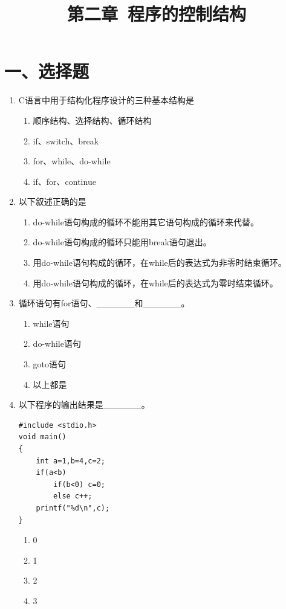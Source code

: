 \documentclass[a4paper,12pt]{article}
\title{\textbf{第二章\ 程序的控制结构}}
\author{}
\date{}
\begin{document}
\maketitle

\section*{一、选择题}

\begin{enumerate}
	\item C语言中用于结构化程序设计的三种基本结构是
	      \begin{enumerate}
		      \item[A)] 顺序结构、选择结构、循环结构
		      \item[B)] if、switch、break
		      \item[C)] for、while、do-while
		      \item[D)] if、for、continue
	      \end{enumerate}
	      \vspace{0.3cm}

	\item 以下叙述正确的是
	      \begin{enumerate}
		      \item[A)] do-while语句构成的循环不能用其它语句构成的循环来代替。
		      \item[B)] do-while语句构成的循环只能用break语句退出。
		      \item[C)] 用do-while语句构成的循环，在while后的表达式为非零时结束循环。
		      \item[D)] 用do-while语句构成的循环，在while后的表达式为零时结束循环。
	      \end{enumerate}
	      \vspace{0.3cm}

	\item 循环语句有for语句、\_\_\_\_\_\_和\_\_\_\_\_\_。
	      \begin{enumerate}
		      \item[A)] while语句
		      \item[B)] do-while语句
		      \item[C)] goto语句
		      \item[D)] 以上都是
	      \end{enumerate}
	      \vspace{0.3cm}

	\item 以下程序的输出结果是\_\_\_\_\_\_。
	      \begin{verbatim}
#include <stdio.h>
void main()
{
    int a=1,b=4,c=2;
    if(a<b)
        if(b<0) c=0;
        else c++;
    printf("%d\n",c);
}
    \end{verbatim}
	      \begin{enumerate}
		      \item[A)] 0
		      \item[B)] 1
		      \item[C)] 2
		      \item[D)] 3
	      \end{enumerate}
	      \vspace{0.3cm}


\end{enumerate}
\end{document}
